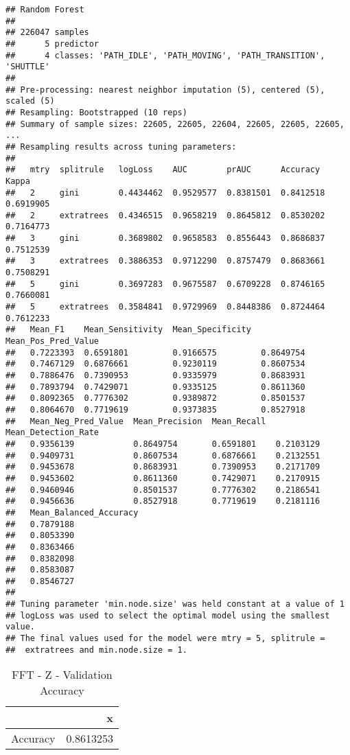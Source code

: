 \documentclass[]{article}
\begin{document}
\begin{verbatim}
## Random Forest 
## 
## 226047 samples
##      5 predictor
##      4 classes: 'PATH_IDLE', 'PATH_MOVING', 'PATH_TRANSITION', 'SHUTTLE' 
## 
## Pre-processing: nearest neighbor imputation (5), centered (5), scaled (5) 
## Resampling: Bootstrapped (10 reps) 
## Summary of sample sizes: 22605, 22605, 22604, 22605, 22605, 22605, ... 
## Resampling results across tuning parameters:
## 
##   mtry  splitrule   logLoss    AUC        prAUC      Accuracy   Kappa    
##   2     gini        0.4434462  0.9529577  0.8381501  0.8412518  0.6919905
##   2     extratrees  0.4346515  0.9658219  0.8645812  0.8530202  0.7164773
##   3     gini        0.3689802  0.9658583  0.8556443  0.8686837  0.7512539
##   3     extratrees  0.3886353  0.9712290  0.8757479  0.8683661  0.7508291
##   5     gini        0.3697283  0.9675587  0.6709228  0.8746165  0.7660081
##   5     extratrees  0.3584841  0.9729969  0.8448386  0.8724464  0.7612233
##   Mean_F1    Mean_Sensitivity  Mean_Specificity  Mean_Pos_Pred_Value
##   0.7223393  0.6591801         0.9166575         0.8649754          
##   0.7467129  0.6876661         0.9230119         0.8607534          
##   0.7886476  0.7390953         0.9335979         0.8683931          
##   0.7893794  0.7429071         0.9335125         0.8611360          
##   0.8092365  0.7776302         0.9389872         0.8501537          
##   0.8064670  0.7719619         0.9373835         0.8527918          
##   Mean_Neg_Pred_Value  Mean_Precision  Mean_Recall  Mean_Detection_Rate
##   0.9356139            0.8649754       0.6591801    0.2103129          
##   0.9409731            0.8607534       0.6876661    0.2132551          
##   0.9453678            0.8683931       0.7390953    0.2171709          
##   0.9453602            0.8611360       0.7429071    0.2170915          
##   0.9460946            0.8501537       0.7776302    0.2186541          
##   0.9456636            0.8527918       0.7719619    0.2181116          
##   Mean_Balanced_Accuracy
##   0.7879188             
##   0.8053390             
##   0.8363466             
##   0.8382098             
##   0.8583087             
##   0.8546727             
## 
## Tuning parameter 'min.node.size' was held constant at a value of 1
## logLoss was used to select the optimal model using the smallest value.
## The final values used for the model were mtry = 5, splitrule =
##  extratrees and min.node.size = 1.
\end{verbatim}

\begin{table}[!h]

\caption{\label{tab:sensor-fft_z-rf-results}FFT - Z - Validation Accuracy}
\centering
\begin{tabular}[t]{lr}
\toprule
  & x\\
\midrule
Accuracy & 0.8613253\\
\bottomrule
\end{tabular}
\end{table}
\end{document}
